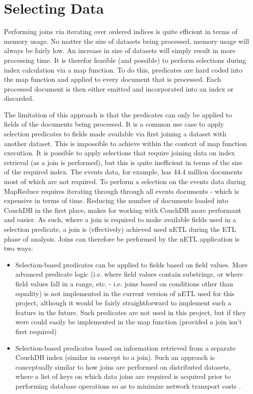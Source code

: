 \section{Selecting Data}
Performing joins via iterating over ordered indices is quite efficient in terms of memory usage. No matter the size of datasets being processed, memory usage will always be fairly low. An increase in size of datasets will simply result in more processing time. It is therefor feasible (and possible) to perform selections during index calculation via a map function. To do this, predicates are hard coded into the map function and applied to every document that is processed. Each processed document is then either emitted and incorporated into an index or discarded.

The limitation of this approach is that the predicates can only be applied to fields of the documents being processed. It is a common use case to apply selection predicates to fields made available via first joining a dataset with another dataset. This is impossible to achieve within the context of map function execution. It is possible to apply selections that require joining data on index retrieval (as a join is performed), but this is quite inefficient in terms of the size of the required index. The events data, for example, has 44.4 million documents most of which are not required. To perform a selection on the events data during MapReduce requires iterating through through all events documents - which is expensive in terms of time. Reducing the number of documents loaded into CouchDB in the first place, makes for working with CouchDB more performant and easier. As such, where a join is required to make available fields used in a selection predicate, a join is (effectively) achieved used nETL during the ETL phase of analysis. Joins can therefore be performed by the nETL application is two ways:

\begin{itemize}
    \item Selection-based predicates can be applied to fields based on field values. More advanced predicate logic (i.e. where field values contain substrings, or where field values fall in a range, etc. - i.e. joins based on conditions other than equality) is not implemented in the current version of nETL used for this project, although it would be fairly straightforward to implement such a feature in the future. Such predicates are not used in this project, but if they were could easily be implemented in the map function (provided a join isn't first required)
    \item Selection-based predicates based on information retrieved from a separate CouchDB index (similar in concept to a join). Such an approach is conceptually similar to how joins are performed on distributed datasets, where a list of keys on which data joins are required is acquired prior to performing database operations so as to minimize network transport costs \cite{sonia2018}.
\end{itemize}

